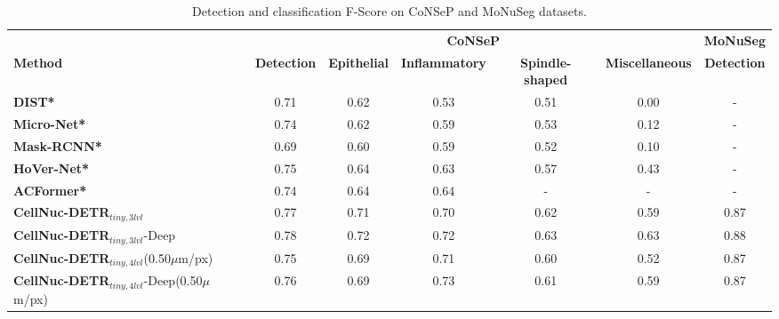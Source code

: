 
\begin{table}[ht]
\vskip -0.1in
\centering
\caption{Detection and classification F-Score on CoNSeP and MoNuSeg datasets. }
\label{tab:consep}
\vskip 0.1in
\begin{adjustbox}{width=0.9\textwidth}
\begin{tabular}{l|ccccc|c}
\toprule
\textbf{} & \multicolumn{5}{c|}{\textbf{CoNSeP}} & \textbf{MoNuSeg} \\
\cmidrule(lr){2-6} \cmidrule(lr){7-7}
\textbf{Method} & \textbf{Detection} & \textbf{Epithelial} & \textbf{Inflammatory} & \textbf{Spindle-shaped} & \textbf{Miscellaneous} & \textbf{Detection} \\
\midrule
\textbf{DIST*} \cite{naylor2018segmentation} & 0.71 & 0.62 & 0.53 & 0.51 & 0.00 & - \\
\textbf{Micro-Net*} \cite{raza2019micro} & 0.74 & 0.62 & 0.59 & 0.53 & 0.12 & - \\
\textbf{Mask-RCNN*} \cite{he2017mask} & 0.69 & 0.60 & 0.59 & 0.52 & 0.10 & - \\
\textbf{HoVer-Net*} \cite{graham2019hover} & 0.75 & 0.64 & 0.63 & 0.57 & 0.43 & - \\
\textbf{ACFormer*} \cite{Huang_2023_ICCV} & 0.74 & 0.64 & 0.64 & - & - & - \\
\midrule
\textbf{CellNuc-DETR}$_{tiny,3lvl}$ & 0.77 & 0.71 & 0.70 & 0.62 & 0.59 & 0.87 \\
\textbf{CellNuc-DETR}$_{tiny,3lvl}$-Deep & 0.78 & 0.72 & 0.72 & 0.63 & 0.63 & 0.88 \\
\textbf{CellNuc-DETR}$_{tiny,4lvl}$(0.50$\mu$m/px) & 0.75 & 0.69 & 0.71 & 0.60 & 0.52 & 0.87 \\
\textbf{CellNuc-DETR}$_{tiny,4lvl}$-Deep(0.50$\mu$m/px) & 0.76 & 0.69 & 0.73 & 0.61 & 0.59 & 0.87 \\


\end{tabular}
\end{adjustbox}
\end{table}
